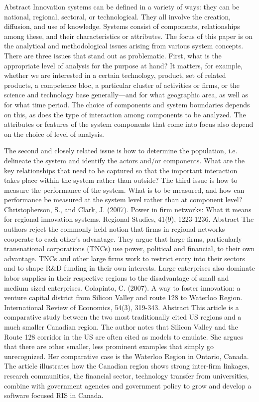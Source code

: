 \documentclass[a4paper,11pt]{article}
\begin{document}
Abstract
Innovation systems can be defined in a variety of ways: they can be national, regional, sectoral, or technological. They all involve the creation, diffusion, and use of knowledge. Systems consist of components, relationships among these, and their characteristics or attributes. The focus of this paper is on the analytical and methodological issues arising from various system concepts. There are three issues that stand out as problematic. First, what is the appropriate level of analysis for the purpose at hand? It matters, for example, whether we are interested in a certain technology, product, set of related products, a competence bloc, a particular cluster of activities or firms, or the science and technology base generally—and for what geographic area, as well as for what time period. The choice of components and system boundaries depends on this, as does the type of interaction among components to be analyzed. The attributes or features of the system components that come into focus also depend on the choice of level of analysis.
 


The second and closely related issue is how to determine the population, i.e. delineate the system and identify the actors and/or components. What are the key relationships that need to be captured so that the important interaction takes place within the system rather than outside? The third issue is how to measure the performance of the system. What is to be measured, and how can performance be measured at the system level rather than at component level?
Christopherson, S., and Clark, J. (2007). Power in firm networks: What it means for regional innovation systems. Regional Studies, 41(9), 1223-1236.
Abstract
The authors reject the commonly held notion that firms in regional networks cooperate to each other’s advantage. They argue that large firms, particularly transnational corporations (TNCs) use power, political and financial, to their own advantage. TNCs and other large firms work to restrict entry into their sectors and to shape R&D funding in their own interests.  Large enterprises also dominate labor supplies in their respective regions to the disadvantage of small and medium sized enterprises.
Colapinto, C. (2007). A way to foster innovation: a venture capital district from Silicon Valley and route 128 to Waterloo Region. International Review of Economics, 54(3), 319-343.
Abstract
This article is a comparative study between the two most traditionally cited US regions and a much smaller Canadian region. The author notes that Silicon Valley and the Route 128 corridor in the US are often cited as models to emulate. She argues that there are other smaller, less prominent examples that simply go unrecognized. Her comparative case is the Waterloo Region in Ontario, Canada. The article illustrates how the Canadian region shows strong inter-firm linkages, research communities, the financial sector, technology transfer from universities, combine with government agencies and government policy to grow and develop a software focused RIS in Canada.
 
\end{document}
